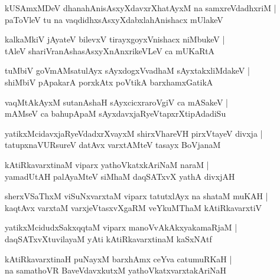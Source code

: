 \begin{shloka}
kUSAmxMDeV dhanahAnisAsxyXdavxrXhatAyxM na samxreVdadhxriM |\\
paToVleV tu na vaqdidhxsAsxyXdabxlahAnishacx mUlakeV
\end{shloka}

\begin{shloka}
kalkaMkiV jAyateV bilevxV tirayxgoyxVnishacx niMbukeV |\\
tAleV shariVranAshasAsxyXnAnxrikeVLeV ca mUKaRtA
\end{shloka}

\begin{shloka}
tuMbiV goVmAMsatulAyx sAyxdogxVvadhaM sAyxtakxliMdakeV |\\
shiMbiV pApakarA porxkAtx poVtikA barxhamxGatikA
\end{shloka}

\begin{shloka}
vaqMtAkAyxM sutanAshaH sAyxcicxraroVgiV ca mASakeV |\\
mAMseV ca bahupApaM sAyxdavxjaRyeVtapxrXtipAdadiSu
\end{shloka}

\begin{shloka}
yatikxMcidavxjaRyeVdadxrXvayxM shirxVhareVH pirxVtayeV divxja |\\
tatupxnaVURsureV datAvx varxtAMteV tasayx BoVjanaM
\end{shloka}

\begin{shloka}
kAtiRkavarxtinaM viparx yathoVkatxkAriNaM naraM |\\
yamadUtAH palAyaMteV siMhaM daqSATxvX yathA divxjAH 
\end{shloka}

\begin{shloka}
sherxVSaThxM viSuNxvarxtaM viparx tatutxlAyx na shataM muKAH |\\
kaqtAvx varxtaM varxjeVtasxvXgaRM veYkuMThaM kAtiRkavarxtiV 
\end{shloka}

\begin{shloka}
yatikxMcidudxSakxqqtaM viparx manoVvAkAkxyakamaRjaM |\\
daqSATxvXtuvilayaM yAti kAtiRkavarxtinaM kaSxNAtf 
\end{shloka}

\begin{shloka}
kAtiRkavarxtinaH puNayxM barxhAmx ceYva catumuRKaH |\\
na samathoVR BaveVdavxkutxM yathoVkatxvarxtakAriNaH 
\end{shloka}

